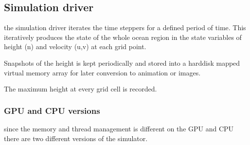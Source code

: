 \documentclass[11pt]{article}
\begin{document}
    \hypertarget{simulation-driver}{%
\subsection{Simulation driver}\label{simulation-driver}}

the simulation driver iterates the time steppers for a defined period of
time. This iteratively produces the state of the whole ocean region in
the state variables of height (n) and velocity (u,v) at each grid point.

Snapshots of the height is kept periodically and stored into a harddisk
mapped virtual memory array for later conversion to animation or images.

The maximum height at every grid cell is recorded.

\hypertarget{gpu-and-cpu-versions}{%
\subsubsection{GPU and CPU versions}\label{gpu-and-cpu-versions}}

since the memory and thread management is different on the GPU and CPU
there are two different versions of the simulator.
\end{document}
